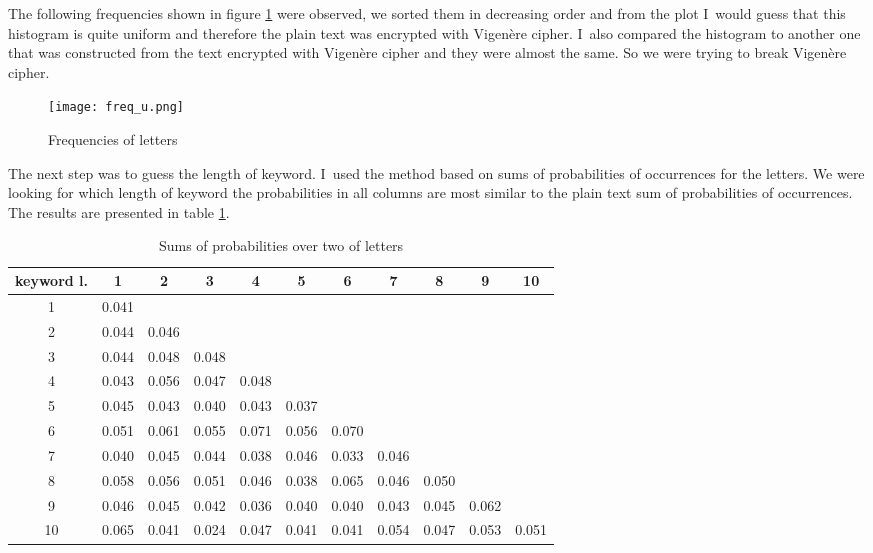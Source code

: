 \documentclass[a4paper,10pt]{article}
\begin{document}
\noindent
The following frequencies shown in figure \ref{fig:freq_u} were observed, we sorted them in decreasing order and from the plot I~would guess that this histogram is quite uniform and therefore the plain text was encrypted with Vigenère cipher. I~also compared the histogram to another one that was constructed from the text encrypted with Vigenère cipher and they were almost the same. So we were trying to break Vigenère cipher.

\begin{figure}[h]
\centering
\texttt{[image: freq\_u.png]}
\caption{Frequencies of letters}
\label{fig:freq_u}
\end{figure}

\noindent
The next step was to guess the length of keyword. I~used the method based on sums of probabilities of occurrences for the letters. We were looking for which length of keyword the probabilities in all columns are most similar to the plain text sum of probabilities of occurrences.\\
The results are presented in table \ref{tab:sf}.

\begin{table}[H]
\centering
\begin{tabular}{|c|c|c|c|c|c|c|c|c|c|c|}
\hline
keyword l. & 1 & 2 & 3 & 4 & 5 & 6 & 7 & 8 & 9 & 10 \\ \hline
1 & 0.041 &&&&&&&&&\\ \hline
2 & 0.044 & 0.046 &&&&&&&&\\ \hline
3 & 0.044 & 0.048 & 0.048 &&&&&&&\\ \hline
4 & 0.043 & 0.056 & 0.047 & 0.048 &&&&&&\\ \hline
5 & 0.045 & 0.043 & 0.040 & 0.043 & 0.037 &&&&&\\ \hline
6 & 0.051 & 0.061 & 0.055 & 0.071 & 0.056 & 0.070 &&&&\\ \hline
7 & 0.040 & 0.045 & 0.044 & 0.038 & 0.046 & 0.033 & 0.046 &&&\\ \hline
8 & 0.058 & 0.056 & 0.051 & 0.046 & 0.038 & 0.065 & 0.046 & 0.050 &&\\ \hline
9 & 0.046 & 0.045 & 0.042 & 0.036 & 0.040 & 0.040 & 0.043 & 0.045 & 0.062 & \\ \hline
10 & 0.065 & 0.041 & 0.024 & 0.047 & 0.041 & 0.041 & 0.054 & 0.047 & 0.053 & 0.051 \\ \hline
\end{tabular}
\caption{Sums of probabilities over two of letters}
\label{tab:sf}
\end{table}
\end{document}
